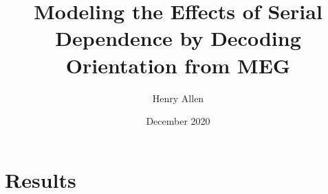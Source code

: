 \documentclass[a4paper,man]{apa6}
\begin{document}
\title{Modeling the Effects of Serial Dependence by Decoding Orientation from MEG}
\author{Henry Allen }
\date{December 2020}

%  

\maketitle

%

%

\section{Results}


%


\end{document}
